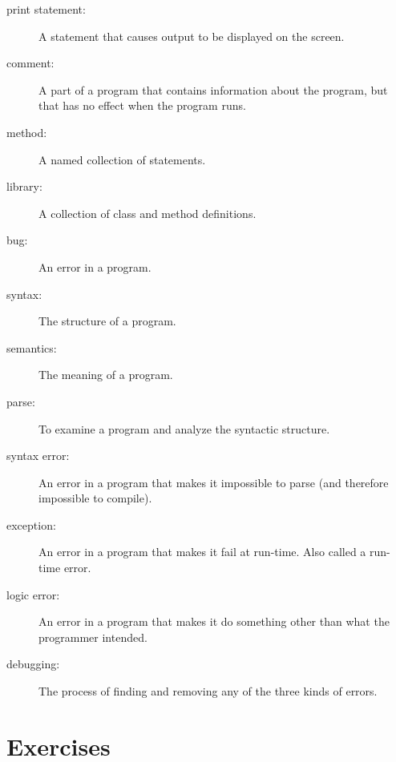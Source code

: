 \documentclass[12pt]{book}
\theoremstyle{exercise}
\begin{document}
\begin{description}
\item[print statement:] A statement that causes output to be displayed
  on the screen.

\item[comment:] A part of a program that contains information
about the program, but that has no effect when the program runs.

\item[method:] A named collection of statements.

\item[library:] A collection of class and method definitions.

\item[bug:]  An error in a program.

\item[syntax:]  The structure of a program.

\item[semantics:]  The meaning of a program.

\item[parse:]  To examine a program and analyze the syntactic structure.

\item[syntax error:]  An error in a program that makes it impossible
to parse (and therefore impossible to compile).

\item[exception:]  An error in a program that makes it fail at
run-time.  Also called a run-time error.

\item[logic error:]  An error in a program that makes it do something
other than what the programmer intended.

\item[debugging:]  The process of finding and removing any of
the three kinds of errors.


\end{description}

\section{Exercises}
\end{document}
